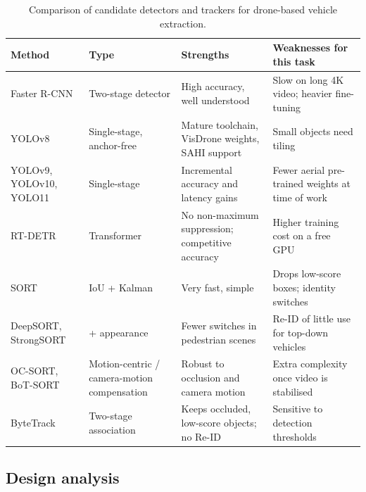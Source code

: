 \begin{table}[htbp]
\centering
\caption{Comparison of candidate detectors and trackers for drone-based vehicle extraction.}
\label{tab:lit-detectors}
\footnotesize\renewcommand{\arraystretch}{1.15}
\begin{tabularx}{\textwidth}{>{\raggedright\arraybackslash}p{2.6cm} >{\raggedright\arraybackslash}p{2.4cm}
  >{\raggedright\arraybackslash}X >{\raggedright\arraybackslash}X}
\toprule
Method & Type & Strengths & Weaknesses for this task \\
\midrule
Faster R-CNN \cite{ren2015faster} & Two-stage detector & High accuracy, well understood & Slow on long 4K video; heavier fine-tuning \\
YOLOv8 \cite{jocher2023yolov8} & Single-stage, anchor-free & Mature toolchain, VisDrone weights, SAHI support & Small objects need tiling \\
YOLOv9, YOLOv10, YOLO11 \cite{wang2024yolov9,wang2024yolov10,khanam2024yolov11} & Single-stage & Incremental accuracy and latency gains & Fewer aerial pre-trained weights at time of work \\
RT-DETR \cite{zhao2024rtdetr} & Transformer & No non-maximum suppression; competitive accuracy & Higher training cost on a free GPU \\
\midrule
SORT \cite{bewley2016sort} & IoU + Kalman & Very fast, simple & Drops low-score boxes; identity switches \\
DeepSORT, StrongSORT \cite{wojke2017deepsort,du2023strongsort} & + appearance & Fewer switches in pedestrian scenes & Re-ID of little use for top-down vehicles \\
OC-SORT, BoT-SORT \cite{cao2023observation,aharon2022botsort} & Motion-centric / camera-motion compensation & Robust to occlusion and camera motion & Extra complexity once video is stabilised \\
ByteTrack \cite{zhang2022bytetrack} & Two-stage association & Keeps occluded, low-score objects; no Re-ID & Sensitive to detection thresholds \\
\bottomrule
\end{tabularx}
\end{table}

\subsection{Design analysis}\label{sec:lit-design}

